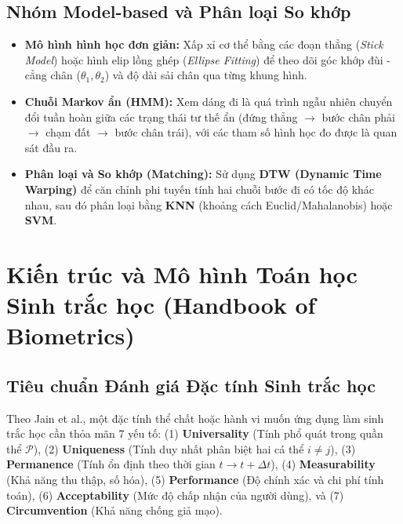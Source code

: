 \documentclass[11pt, a4paper]{article}
\begin{document}
\subsection{Nhóm Model-based và Phân loại So khớp}
\begin{itemize}
    \item \textbf{Mô hình hình học đơn giản:} Xấp xỉ cơ thể bằng các đoạn thẳng (\textit{Stick Model}) hoặc hình elip lồng ghép (\textit{Ellipse Fitting}) để theo dõi góc khớp đùi - cẳng chân ($\theta_1, \theta_2$) và độ dài sải chân qua từng khung hình.
    \item \textbf{Chuỗi Markov ẩn (HMM):} Xem dáng đi là quá trình ngẫu nhiên chuyển đổi tuần hoàn giữa các trạng thái tư thế ẩn (đứng thẳng $\rightarrow$ bước chân phải $\rightarrow$ chạm đất $\rightarrow$ bước chân trái), với các tham số hình học đo được là quan sát đầu ra.
    \item \textbf{Phân loại và So khớp (Matching):} Sử dụng \textbf{DTW (Dynamic Time Warping)} để căn chỉnh phi tuyến tính hai chuỗi bước đi có tốc độ khác nhau, sau đó phân loại bằng \textbf{KNN} (khoảng cách Euclid/Mahalanobis) hoặc \textbf{SVM}.
\end{itemize}

\section{Kiến trúc và Mô hình Toán học Sinh trắc học (Handbook of Biometrics)}

\subsection{Tiêu chuẩn Đánh giá Đặc tính Sinh trắc học}
Theo Jain et al., một đặc tính thể chất hoặc hành vi muốn ứng dụng làm sinh trắc học cần thỏa mãn 7 yếu tố: (1) \textbf{Universality} (Tính phổ quát trong quần thể $\mathcal{P}$), (2) \textbf{Uniqueness} (Tính duy nhất phân biệt hai cá thể $i \neq j$), (3) \textbf{Permanence} (Tính ổn định theo thời gian $t \rightarrow t + \Delta t$), (4) \textbf{Measurability} (Khả năng thu thập, số hóa), (5) \textbf{Performance} (Độ chính xác và chi phí tính toán), (6) \textbf{Acceptability} (Mức độ chấp nhận của người dùng), và (7) \textbf{Circumvention} (Khả năng chống giả mạo).
\end{document}
